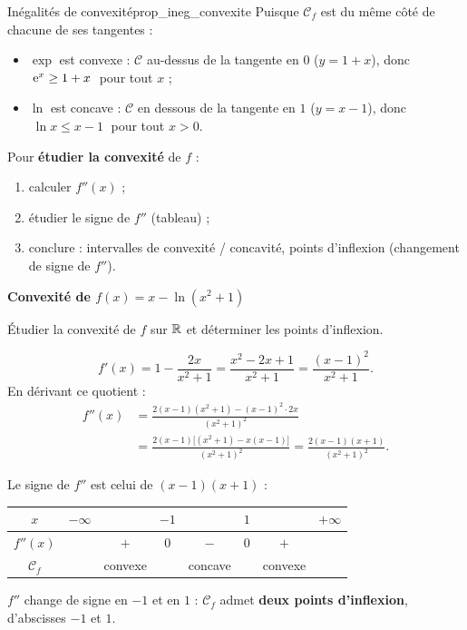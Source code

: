 \begin{propriete}{Inégalités de convexité}{prop_ineg_convexite}
	Puisque $\mathcal C_f$ est du même côté de chacune de ses tangentes :
	\begin{itemize}[label=\textbullet]
		\item $\exp$ est convexe : $\mathcal C$ au-dessus de la tangente en $0$
		($y=1+x$), donc $\;\mathrm{e}^{x}\geq 1+x\;$ pour tout $x$ ;
		\item $\ln$ est concave : $\mathcal C$ en dessous de la tangente en $1$
		($y=x-1$), donc $\;\ln x\leq x-1\;$ pour tout $x>0$.
	\end{itemize}
\end{propriete}

\begin{methode}
	Pour \textbf{étudier la convexité} de $f$ :
	\begin{enumerate}
		\item calculer $f''(x)$ ;
		\item étudier le signe de $f''$ (tableau) ;
		\item conclure : intervalles de convexité / concavité, points d'inflexion
		(changement de signe de $f''$).
	\end{enumerate}
\end{methode}

\exerciceresolu
\textbf{Convexité de $f(x)=x-\ln(x^{2}+1)$}

Étudier la convexité de $f$ sur $\mathbb{R}$ et déterminer les points d'inflexion.

\solution

\[
f'(x)=1-\frac{2x}{x^{2}+1}
=\frac{x^{2}-2x+1}{x^{2}+1}
=\frac{(x-1)^{2}}{x^{2}+1}.
\]
En dérivant ce quotient :
\[
\begin{aligned}
f''(x)
&=\frac{2(x-1)(x^{2}+1)-(x-1)^{2}\cdot 2x}{(x^{2}+1)^{2}} \\[0.3em]
&=\frac{2(x-1)\bigl[(x^{2}+1)-x(x-1)\bigr]}{(x^{2}+1)^{2}}
 =\frac{2(x-1)(x+1)}{(x^{2}+1)^{2}}.
\end{aligned}
\]

Le signe de $f''$ est celui de $(x-1)(x+1)$ :
\begin{center}
\renewcommand{\arraystretch}{1.4}
\begin{tabular}{c|ccccccc}
$x$       & $-\infty$ & & $-1$ & & $1$ & & $+\infty$ \\
\hline
$f''(x)$  & & $+$ & $0$ & $-$ & $0$ & $+$ & \\
\hline
$\mathcal C_f$ & & convexe & & concave & & convexe & \\
\end{tabular}
\end{center}
$f''$ change de signe en $-1$ et en $1$ : $\mathcal C_f$ admet \textbf{deux
points d'inflexion}, d'abscisses $-1$ et $1$.


